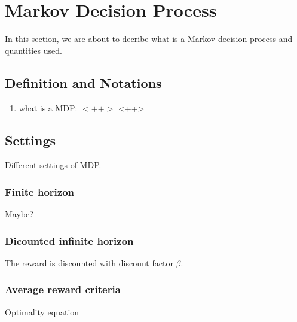 \chapter{Markov Decision Process}
\label{ch:mdp}

In this section, we are about to decribe what is a Markov decision process and quantities used.

\section{Definition and Notations}

\begin{enumerate}
    \item what is a MDP: $<++>$ <++>
\end{enumerate}

\section{Settings}

Different settings of MDP.

\subsection{Finite horizon}

Maybe?

\subsection{Dicounted infinite horizon}

The reward is discounted with discount factor $\beta$.

\subsection{Average reward criteria}

Optimality equation

